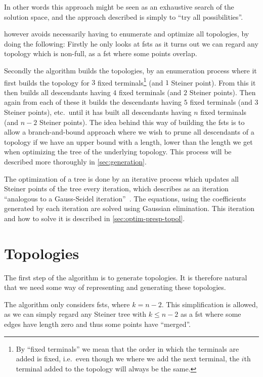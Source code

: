 In other words this approach might be seen as an exhaustive search of the
solution space, and the approach described is simply to ``try all
possibilities''.

\citeauthor{smith1992} however avoids necessarily having to enumerate and optimize all
topologies, by doing the following: Firstly he only looks at \acp{fst} as it
turns out we can regard any topology which is non-full, as a \ac{fst} where
some points overlap.

Secondly the algorithm builds the topologies, by an enumeration process where it
first builds the topology for $3$ fixed terminals\footnote{By ``fixed
  terminals'' we mean that the order in which the terminals are added is fixed,
  i.e.\ even though we where we add the next terminal, the $i$th terminal added
  to the topology will always be the same.} (and $1$ Steiner point). From
this it then builds all descendants having $4$ fixed terminals (and $2$ Steiner
points). Then again from each of these it builds the descendants having $5$ fixed
terminals (and $3$ Steiner points), etc.\, until it has built all descendants
having $n$ fixed terminals (and $n-2$ Steiner points). The idea behind this way of
building the \acp{fst} is to allow a branch-and-bound approach where we wish to
prune all descendants of a topology if we have an upper bound with a length,
lower than the length we get when optimizing the tree of the underlying
topology.  This process will be described more thoroughly in
\cref{sec:generation}.

The optimization of a tree is done by an iterative process which updates all
Steiner points of the tree every iteration, which \citeauthor{smith1992}
describes as an iteration ``analogous to a Gauss-Seidel
iteration''~\cite[p.~145]{smith1992}. The equations, using the coefficients
generated by each iteration are solved using Gaussian elimination. This
iteration and how to solve it is described in \cref{sec:optim-presp-topol}.

\section{Topologies}
\label{sec:topologies}

The first step of the algorithm is to generate topologies. It is therefore
natural that we need some way of representing and generating these topologies.

The algorithm only considers \acp{fst}, where $k = n - 2$. This simplification
is allowed, as we can simply regard any Steiner tree with $k \le n - 2$ as a
\ac{fst} where some edges have length zero and thus some points have
``merged''.

